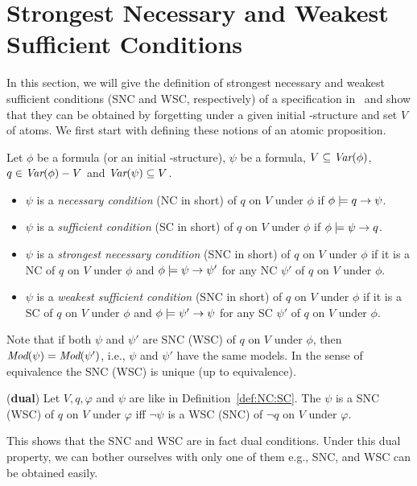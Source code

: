 \documentclass{article}
\begin{document}
\section{Strongest Necessary and Weakest Sufficient Conditions}
In this section, we will give the definition of strongest necessary and weakest sufficient conditions (SNC and WSC, respectively) of a specification in \CTL\ and show that they can be obtained by forgetting under a given initial \MPK-structure and set $V$ of atoms.
We first start with defining these notions of an atomic proposition.
\begin{definition}\label{def:NC:SC}
Let $\phi$ be a formula (or an initial \MPK-structure), $\psi$ be a formula, $V \subseteq \textit{Var}(\phi)$, $q\in\textit{Var}(\phi)- V$
and $\textit{Var}(\psi)\subseteq V$.
\begin{itemize}
  \item $\psi$  is a {\em necessary condition} (NC in short) of $q$ on $V$ under $\phi$
    if $\phi \models q \rightarrow \psi$.
  \item $\psi$  is a {\em sufficient condition} (SC in short) of $q$ on $V$ under $\phi$
    if $\phi \models \psi\rightarrow q$.
  \item $\psi$  is a {\em strongest necessary condition} (SNC in short)
  of $q$ on $V$ under $\phi$
    if it is a NC of $q$ on $V$ under $\phi$ and $\phi\models\psi\rightarrow\psi'$
    for any NC $\psi'$ of $q$ on $V$ under $\phi$.

    \item $\psi$  is a {\em weakest sufficient condition} (SNC in short)
  of $q$ on $V$ under $\phi$
    if it is a SC of $q$ on $V$ under $\phi$ and $\phi\models\psi'\rightarrow\psi$
    for any SC $\psi'$ of $q$ on $V$ under $\phi$.
\end{itemize}
\end{definition}
Note that if both $\psi$ and $\psi'$ are SNC (WSC) of $q$ on $V$ under $\phi$, then
$\textit{Mod}(\psi)=\textit{Mod}(\psi')$, i.e., $\psi$ and $\psi'$ have the same models. In the sense
of equivalence the SNC (WSC) is unique (up to equivalence).



\begin{proposition}\label{dual}
(\textbf{dual})
 Let $V,q,\varphi$ and $\psi$ are like in Definition~\ref{def:NC:SC}.
 The $\psi$ is a SNC (WSC) of $q$ on $V$ under $\varphi$ iff $\neg \psi$ is a WSC (SNC)
    of $\neg q$ on $V$ under $\varphi$.
\end{proposition}
This shows that the SNC and WSC are in fact dual conditions. Under this dual property, we can bother ourselves with only one of them e.g., SNC,  and WSC can be obtained easily. %
%
\end{document}

